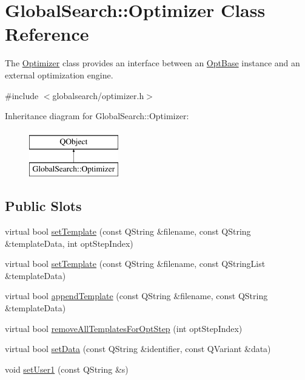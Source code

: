\hypertarget{classGlobalSearch_1_1Optimizer}{}\section{Global\+Search\+:\+:Optimizer Class Reference}
\label{classGlobalSearch_1_1Optimizer}


The \hyperlink{classGlobalSearch_1_1Optimizer}{Optimizer} class provides an interface between an \hyperlink{classGlobalSearch_1_1OptBase}{Opt\+Base} instance and an external optimization engine.  




{\ttfamily \#include $<$globalsearch/optimizer.\+h$>$}

Inheritance diagram for Global\+Search\+:\+:Optimizer\+:\begin{figure}[H]
\begin{center}
\leavevmode
\includegraphics[height=2.000000cm]{classGlobalSearch_1_1Optimizer}
\end{center}
\end{figure}
\subsection*{Public Slots}
\begin{DoxyCompactItemize}
\item 
virtual bool \hyperlink{classGlobalSearch_1_1Optimizer_a83db0ac69c8b97825fc5d8361107ada4}{set\+Template} (const Q\+String \&filename, const Q\+String \&template\+Data, int opt\+Step\+Index)
\item 
virtual bool \hyperlink{classGlobalSearch_1_1Optimizer_ab4be28b4fc40d106ffa5ae1c9d67a6f3}{set\+Template} (const Q\+String \&filename, const Q\+String\+List \&template\+Data)
\item 
virtual bool \hyperlink{classGlobalSearch_1_1Optimizer_a8734827ff8773648cf4da48988208d87}{append\+Template} (const Q\+String \&filename, const Q\+String \&template\+Data)
\item 
virtual bool \hyperlink{classGlobalSearch_1_1Optimizer_a894c2cc508b92f2bb1678cc750faab30}{remove\+All\+Templates\+For\+Opt\+Step} (int opt\+Step\+Index)
\item 
virtual bool \hyperlink{classGlobalSearch_1_1Optimizer_a0bea17818fd8f29a13542119aebf2377}{set\+Data} (const Q\+String \&identifier, const Q\+Variant \&data)
\item 
void \hyperlink{classGlobalSearch_1_1Optimizer_adfb8a9de9d1eac7d5b188f6ae24c5ebc}{set\+User1} (const Q\+String \&s)
\end{DoxyCompactItemize}
